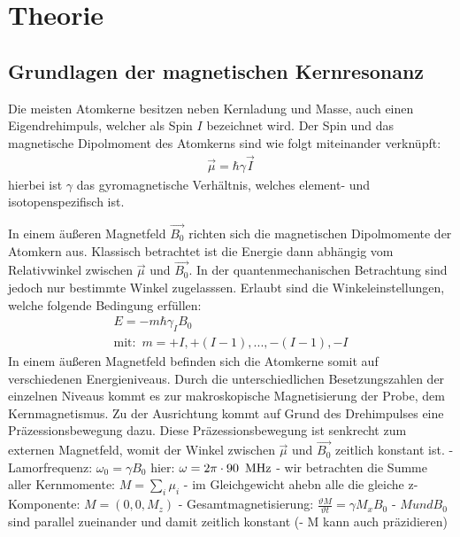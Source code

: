 \section{Theorie}
\label{sec:Theorie}
\subsection{Grundlagen der magnetischen Kernresonanz}
Die meisten Atomkerne besitzen neben Kernladung und Masse, auch einen Eigendrehimpuls, welcher als Spin $I$ bezeichnet wird.
Der Spin und das magnetische Dipolmoment des Atomkerns sind wie folgt miteinander verkn\"{u}pft:
\begin{align}
	\overrightarrow{\mu} = \hbar \gamma \overrightarrow{I}
\end{align}
hierbei ist $\gamma$ das gyromagnetische Verh\"{a}ltnis, welches element- und isotopenspezifisch ist.

In einem \"{a}u{\ss}eren Magnetfeld $\overrightarrow{B_0}$ richten sich die magnetischen Dipolmomente der Atomkern aus.
Klassisch betrachtet ist die Energie dann abh\"{a}ngig vom Relativwinkel zwischen $\overrightarrow{\mu}$ und $\overrightarrow{B_0}$.
In der quantenmechanischen Betrachtung sind jedoch nur bestimmte Winkel zugelasssen.
Erlaubt sind die Winkeleinstellungen, welche folgende Bedingung erf\"{u}llen:
\begin{align}
	E = -m \hbar \gamma_I B_0  \\
	\text{mit:} \, \, \,  m = +I, +(I-1), ..., -(I-1), -I
\end{align}
In einem \"{a}u{\ss}eren Magnetfeld befinden sich die Atomkerne somit auf verschiedenen Energieniveaus.
Durch die unterschiedlichen Besetzungszahlen der einzelnen Niveaus kommt es zur  makroskopische Magnetisierung der Probe, dem Kernmagnetismus.
Zu der Ausrichtung kommt auf Grund des Drehimpulses eine Pr\"{a}zessionsbewegung dazu.
Diese Pr\"{a}zessionsbewegung ist senkrecht zum externen Magnetfeld, womit der Winkel zwischen $\overrightarrow{\mu}$ und $\overrightarrow{B_0}$ zeitlich konstant ist.
- Lamorfrequenz: $\omega_0 = \gamma B_0$ hier: $\omega = 2\pi \cdot 90 \text{\, MHz}$
- wir betrachten die Summe aller Kernmomente: $M = \sum_i \mu_i$
- im Gleichgewicht ahebn alle die gleiche z-Komponente: $M = (0,0,M_z)$
- Gesamtmagnetisierung: $\frac{\vartheta M}{\vartheta t} = \gamma M_x B_0$
- $M und B_0$ sind parallel zueinander und damit zeitlich konstant
(- M kann auch pr\"{a}zidieren)

